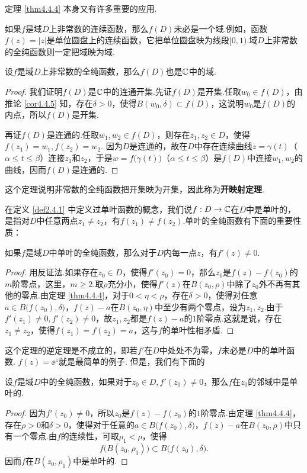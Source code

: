定理 \ref{thm4.4.4} 本身又有许多重要的应用.

如果$f$是域$D$上非常数的连续函数，那么$f(D)$未必是一个域.例如，函数$f(z)=|z|$是单位圆盘上的连续函数，它把单位圆盘映为线段$[0,1)$.域$D$上非常数的全纯函数则一定把域映为域.

\begin{theorem}\label{thm4.4.6}
  设$f$是域$D$上非常数的全纯函数，那么$f(D)$也是$\mathbb C$中的域.
\end{theorem}
\begin{proof}
  我们证明$f(D)$是$\mathbb C$中的连通开集.先证$f(D)$是开集.任取$w_0\in f(D)$，由推论 \ref{cor4.4.5} 知，存在$\delta>0$，使得$B(w_0,\delta)\subset f(D)$，这说明$w_0$是$f(D)$的内点，所以$f(D)$是开集.

  再证$f(D)$是连通的.任取$w_1,w_2\in f(D)$，则存在$z_1,z_2\in D$，使得$f(z_1)=w_1,f(z_2)=w_2$. 因为$D$是连通的，故在$D$中存在连续曲线$z=\gamma(t)$（$\alpha\le t\le \beta$）连接$z_1$和$z_2$，于是$w=f\big(\gamma(t)\big)$（$\alpha\le t\le \beta$）是$f(D)$中连接$w_1,w_2$的曲线，因而$f(D)$是连通的.
\end{proof}

这个定理说明非常数的全纯函数把开集映为开集，因此称为\textbf{开映射定理}.

在定义 \ref{def2.4.1} 中定义过单叶函数的概念，我们说$f:D\to\mathbb C$在$D$中是单叶的，是指对$D$中任意两点$z_1\ne z_2$，有$f(z_1)\ne f(z_2)$.单叶的全纯函数有下面的重要性质：
\begin{theorem}\label{thm4.4.7}
  如果$f$是域$D$中单叶的全纯函数，那么对于$D$内每一点$z$，有$f'(z)\ne0$.
\end{theorem}
\begin{proof}
  用反证法.如果存在$z_0\in D$，使得$f'(z_0)=0$，那么$z_0$是$f(z)-f(z_0)$的$m$阶零点，这里，$m\ge2$.取$\rho$充分小，使得$f'(z)$在$B(z_0,\rho)$中除了$z_0$外不再有其他的零点.由定理 \ref{thm4.4.4}，对于$0<\eta<\rho$，存在$\delta>0$，使得对任意$a\in B\big(f(z_0),\delta\big)$，$f(z)-a$在$B(z_0,\eta)$中至少有两个零点，设为$z_1,z_2$.由于$f'(z_1)\ne0,f'(z_2)\ne0$，故$z_1,z_2$都是$f(z)-a$的$1$阶零点.这就是说，存在$z_1\ne z_2$，使得$f(z_1)=f(z_2)=a$，这与$f$的单叶性相矛盾.
\end{proof}

这个定理的逆定理是不成立的，即若$f'$在$D$中处处不为零，$f$未必是$D$中的单叶函数. $f(z)=\ee^z$就是最简单的例子. 但是，我们有下面的
\begin{theorem}\label{thm4.4.8}
  设$f$是域$D$中的全纯函数，如果对于$z_0\in D,f'(z_0)\ne0$，那么$f$在$z_0$的邻域中是单叶的.
\end{theorem}
\begin{proof}
  因为$f'(z_0)\ne0$，所以$z_0$是$f(z)-f(z_0)$的$1$阶零点.由定理 \ref{thm4.4.4}，存在$\rho>0$和$\delta>0$，使得对于任意的$a\in B\big(f(z_0),\delta\big)$，$f(z)-a$在$B(z_0,\rho)$中只有一个零点.由$f$的连续性，可取$\rho_1<\rho$，使得
  \[
    f\big(B(z_0,\rho_1)\big)\subset B\big(f(z_0),\delta\big).
  \]
  因而$f$在$B(z_0,\rho_1)$中是单叶的.
\end{proof}

